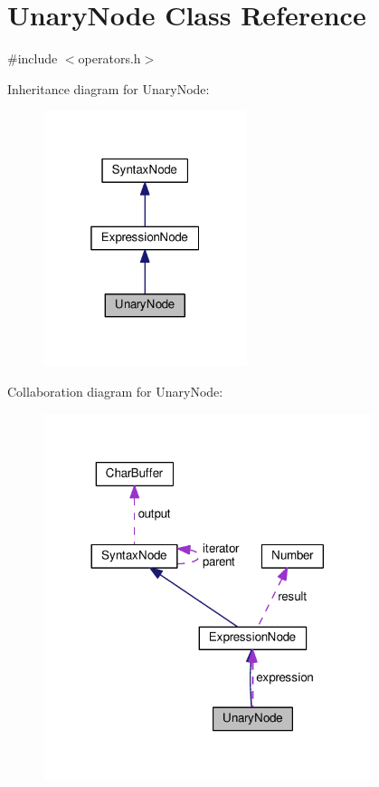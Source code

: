 \hypertarget{classUnaryNode}{}\section{Unary\+Node Class Reference}
\label{classUnaryNode}


{\ttfamily \#include $<$operators.\+h$>$}



Inheritance diagram for Unary\+Node\+:\nopagebreak
\begin{figure}[H]
\begin{center}
\leavevmode
\includegraphics[width=169pt]{classUnaryNode__inherit__graph}
\end{center}
\end{figure}


Collaboration diagram for Unary\+Node\+:\nopagebreak
\begin{figure}[H]
\begin{center}
\leavevmode
\includegraphics[width=272pt]{classUnaryNode__coll__graph}
\end{center}
\end{figure}
